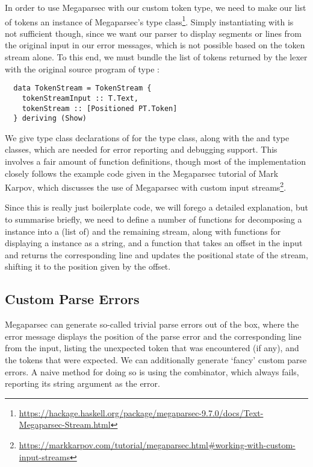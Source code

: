 In order to use Megaparsec with our custom token type, we need to make our list
of tokens an instance of Megaparsec's  type class\footnote{\url{https://hackage.haskell.org/package/megaparsec-9.7.0/docs/Text-Megaparsec-Stream.html}}.
Simply instantiating  with  is not
sufficient though, since we want our parser to display segments or lines from
the original input in our error messages, which is not possible based on the
token stream alone.
To this end, we must bundle the list of tokens returned by the lexer with the
original source program of type :
%
\begin{verbatim}
  data TokenStream = TokenStream {
    tokenStreamInput :: T.Text,
    tokenStream :: [Positioned PT.Token]
  } deriving (Show)
\end{verbatim}

We give type class declarations of  for the 
type class, along with the  and 
type classes, which are needed for error reporting and debugging support.
This involves a fair amount of function definitions, though most of the
implementation closely follows the example code given in the Megaparsec tutorial
of Mark Karpov, which discusses the use of Megaparsec with custom input
streams\footnote{\url{https://markkarpov.com/tutorial/megaparsec.html\#working-with-custom-input-streams}}.

Since this is really just boilerplate code, we will forego a detailed
explanation, but to summarise briefly, we need to define a number of functions
for decomposing a  instance into a (list of)
 and the remaining stream, along with functions for
displaying a  instance as a string, and a function that
takes an offset in the input and returns the corresponding line and updates the
positional state of the stream, shifting it to the position given by the offset.


\subsection{Custom Parse Errors}

Megaparsec can generate so-called trivial parse errors out of the box, where the
error message displays the position of the parse error and the corresponding
line from the input, listing the unexpected token that was encountered (if any),
and the tokens that were expected.
We can additionally generate `fancy' custom parse errors. A naive method for
doing so is using the  combinator, which always fails, reporting
its string argument as the error.

